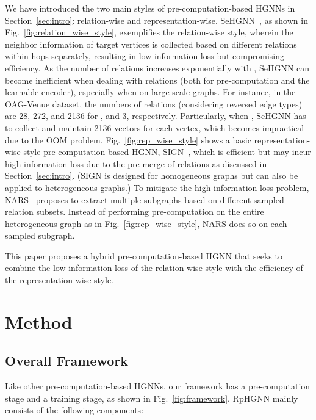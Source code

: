 \documentclass[lettersize,journal]{IEEEtran}
\begin{document}
We have introduced the two main styles of pre-computation-based HGNNs in Section~\ref{sec:intro}: relation-wise and representation-wise.
SeHGNN~\cite{yang2022simple}, as shown in Fig.~\ref{fig:relation_wise_style}, exemplifies the relation-wise style, wherein the neighbor information of target vertices is collected based on different relations within  hops separately, resulting in low information loss but compromising efficiency.
As the number of relations increases exponentially with , SeHGNN can become inefficient when dealing with relations (both for pre-computation and the learnable encoder), especially when  on large-scale graphs.
For instance, in the OAG-Venue dataset, the numbers of relations (considering reversed edge types) are 28, 272, and 2136 for , and 3, respectively.
Particularly, when , SeHGNN has to collect and maintain 2136 vectors for each vertex, which becomes impractical due to the OOM problem.
Fig.~\ref{fig:rep_wise_style} shows a basic representation-wise style pre-computation-based HGNN, SIGN~\cite{frasca2020sign}, which is efficient but may incur high information loss due to the pre-merge of relations as discussed in Section~\ref{sec:intro}.
(SIGN is designed for homogeneous graphs but can also be applied to heterogeneous graphs.)
To mitigate the high information loss problem, NARS~\cite{yu2020scalable} proposes to extract multiple subgraphs based on different sampled relation subsets. 
Instead of performing pre-computation on the entire heterogeneous graph as in Fig.~\ref{fig:rep_wise_style}, NARS does so on each sampled subgraph.



This paper proposes a hybrid pre-computation-based HGNN that seeks to combine the low information loss of the relation-wise style with the efficiency of the representation-wise style.











\section{Method}

\subsection{Overall Framework}

Like other pre-computation-based HGNNs, our framework has a pre-computation stage and a training stage, as shown in Fig.~\ref{fig:framework}.
RpHGNN mainly consists of the following components:
\end{document}
